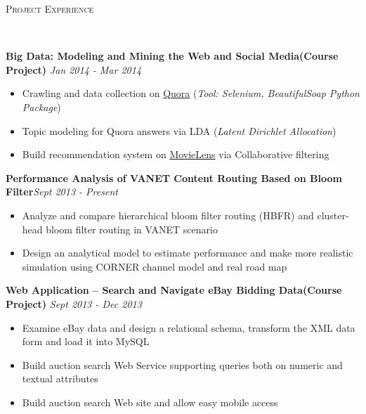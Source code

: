 \documentclass[9pt]{article}
\newenvironment{changemargin}[2]{%
  \begin{list}{}{%
    \setlength{\topsep}{0pt}%
    \setlength{\leftmargin}{#1}%
    \setlength{\rightmargin}{#2}%
    \setlength{\listparindent}{\parindent}%
    \setlength{\itemindent}{\parindent}%
    \setlength{\parsep}{\parskip}%
  }%
  \item[]}{\end{list}
}
\newcommand{\lineover}{
	\begin{changemargin}{-0.05in}{-0.05in}
		\vspace*{-8pt}
		\hrulefill \\
		\vspace*{-2pt}
	\end{changemargin}
}
\newcommand{\header}[1]{
	\begin{changemargin}{-0.5in}{-0.5in}
		\scshape{#1}\\
  	\lineover
	\end{changemargin}
}
\newenvironment{body} {
	\vspace*{-16pt}
	\begin{changemargin}{-0.25in}{-0.5in}
  }	
	{\end{changemargin}
}
\begin{document}
\smallskip
\header{Project Experience}

\begin{body}
	\vspace{14pt}
	\textbf{Big Data: Modeling and Mining the Web and Social Media(Course Project)}
	\hfill\emph{Jan 2014 - Mar 2014}
	\vspace*{-4pt}
	\begin{itemize}
	\item
	Crawling and data collection on \href{http://www.quora.com/}{Quora} (\emph{Tool: Selenium, BeautifulSoap Python Package})
	\item
	Topic modeling for Quora answers via LDA (\emph{Latent Dirichlet Allocation})
	\item
	Build recommendation system on \href{http://grouplens.org/datasets/movielens/}{MovieLens} via Collaborative filtering
	\end{itemize}
	
	
	\textbf{Performance Analysis of VANET Content Routing Based on Bloom Filter}\hfill \emph{Sept 2013 - Present}\\
	\vspace*{-4pt}
	\begin{itemize} \itemsep -0pt
	\item Analyze and compare hierarchical bloom filter routing (HBFR) and cluster-head bloom filter routing
	in VANET scenario
	\item Design an analytical model to estimate performance and make more realistic simulation using CORNER channel model and real road map
	\end{itemize}
%	
	 
	 \textbf{Web Application -- Search and Navigate eBay Bidding Data(Course Project)}
	 \hfill \emph{Sept 2013 - Dec 2013}\\
	 	\vspace*{-4pt}
	\begin{itemize} \itemsep -0pt  %
		\item Examine eBay data and design a relational schema, transform the XML data form and load it into MySQL
		\item Build auction search Web Service supporting queries both on numeric and textual attributes
		\item Build auction search Web site and allow easy mobile access
	\end{itemize}
	

\end{body}
\end{document}
